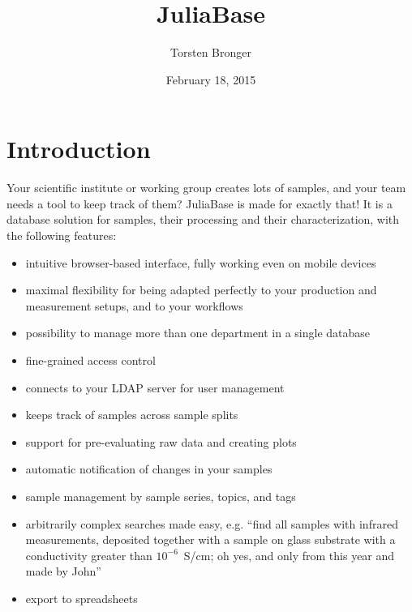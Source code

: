 \documentclass[a4paper,11pt,english]{sphinxmanual}
\title{JuliaBase}
\date{February 18, 2015}
\author{Torsten Bronger}
\begin{document}
\maketitle
\tableofcontents
{}\label{toc::doc}



\chapter{Introduction}
\label{index:introduction}\label{index::doc}\label{index:juliabase}
Your scientific institute or working group creates lots of samples, and your
team needs a tool to keep track of them?  JuliaBase is made for exactly that!
It is a database solution for samples, their processing and their
characterization, with the following features:
\begin{itemize}
\item {} 
intuitive browser-based interface, fully working even on mobile devices

\item {} 
maximal flexibility for being adapted perfectly to your production and
measurement setups, and to your workflows

\item {} 
possibility to manage more than one department in a single database

\item {} 
fine-grained access control

\item {} 
connects to your LDAP server for user management

\item {} 
keeps track of samples across sample splits

\item {} 
support for pre-evaluating raw data and creating plots

\item {} 
automatic notification of changes in your samples

\item {} 
sample management by sample series, topics, and tags

\item {} 
arbitrarily complex searches made easy, e.g. “find all samples with infrared
measurements, deposited together with a sample on glass substrate with a
conductivity greater than \(10^{-6}\) S/cm; oh yes, and only from this year and made
by John”

\item {} 
export to spreadsheets


\end{itemize}
\end{document}

